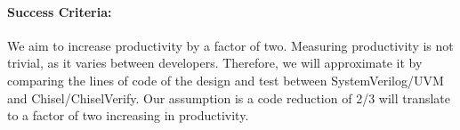 \documentclass[fleqn,12pt]{article}
\begin{document}
\paragraph*{Success Criteria:}
We aim to increase productivity by a factor of two. Measuring productivity
is not trivial, as it varies between developers. Therefore, we will approximate it by comparing the
lines of code of the design and test between SystemVerilog/UVM and Chisel/ChiselVerify.
Our assumption is a code reduction of 2/3 will translate to a factor of two increasing in productivity.


\end{document}
